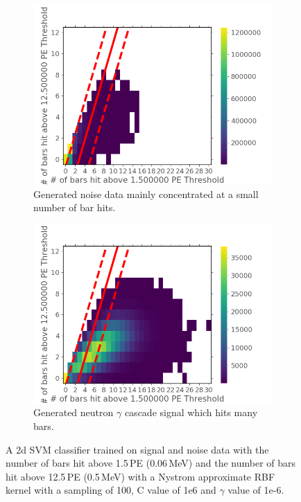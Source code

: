 \begin{figure}[!h]
\centering
\begin{subfigure}{.5\textwidth}
  \centering
  \includegraphics[width=\linewidth]{Chapter4/Figs/Raster/noiseNeutronSVM_C1e6_g1e-6.png}
  \captionsetup{width=.9\linewidth}
  \caption{Generated noise data mainly concentrated at a small number of bar hits.}
  \label{subFig:noiseNeutronSVM_C1e6_g1e-6}
\end{subfigure}%
\begin{subfigure}{.5\textwidth}
  \centering
  \includegraphics[width=\linewidth]{Chapter4/Figs/Raster/signalNeutronSVM_C1e6_g1e-6.png}
  \captionsetup{width=.9\linewidth}
  \caption{Generated neutron $\gamma$ cascade signal which hits many bars.}
  \label{subFig:signalNeutronSVM_C1e6_g1e-6}
\end{subfigure}
\caption{A 2d SVM classifier trained on signal and noise data with the number of bars hit above 1.5\,PE (0.06\,MeV) and the number of bars hit above 12.5\,PE (0.5\,MeV) with a Nystrom approximate RBF kernel with a sampling of 100, C value of 1e6 and $\gamma$ value of 1e-6.}
\label{fig:signalAndNoiseNeutronSVM_C1e6_g1e-6}
\end{figure}

